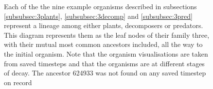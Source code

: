\begin{figure}[ht]
    \begin{center}
    \end{center}
    \caption{
    Each of the the nine example organisms described in subsections \ref{subsubsec:3plants}, \ref{subsubsec:3decomp} and \ref{subsubsec:3pred} represent a lineage among either plants, decomposers or predators. This diagram represents them as the leaf nodes of their family three, with their mutual most common ancestors included, all the way to the initial organism. Note that the organism visualisations are taken from saved timesteps and that the organisms are at different stages of decay. The ancestor 624933 was not found on any saved timestep on record
    }
    \label{fig:familyTree}
\end{figure}
